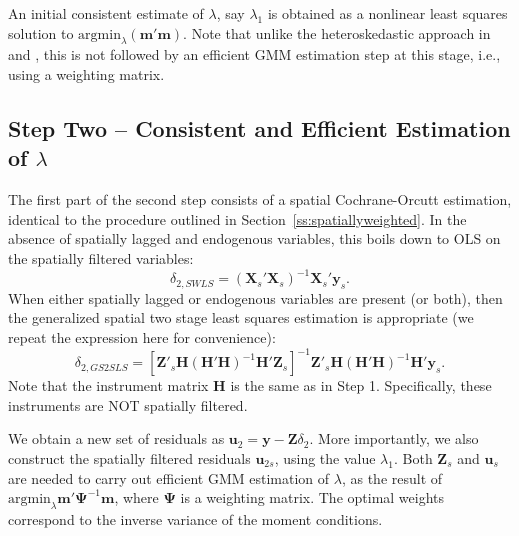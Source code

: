 \documentclass{article}
\begin{document}
 An initial consistent estimate of $\lambda$,
 say $\lambda_1$ is obtained as a nonlinear least
squares solution to $\mbox{argmin}_\lambda (\mathbf{m'm})$.
Note that unlike the heteroskedastic approach in \cite{KelejianPrucha:10} and \cite{Arraizetal:10},
this is not followed by an efficient GMM estimation step at this stage, i.e., using
a weighting matrix. 

\subsection{Step Two -- Consistent and Efficient Estimation of $\lambda$}\label{ss:steptwoestim}
 The first part of the second step consists of a spatial Cochrane-Orcutt estimation,
 identical to the procedure outlined in Section~\ref{ss:spatiallyweighted}. In the
 absence of spatially lagged and endogenous variables, this boils down to OLS on
 the spatially filtered variables:
 \begin{equation*}
 \delta_{2,SWLS} = (\mathbf{X}_{s}'\mathbf{X}_s)^{-1} \mathbf{X}_{s}' \mathbf{y}_s.
 \end{equation*}
 When either spatially lagged or endogenous variables are present (or both), then
 the generalized spatial two stage least squares estimation is appropriate
 (we repeat the expression here for convenience):
 \begin{equation*}
\delta_{2,GS2SLS} = [ \mathbf{Z'}_s \mathbf{H} (\mathbf{H'H})^{-1} \mathbf{H'} \mathbf{Z}_s ]^{-1} \mathbf{Z'}_s \mathbf{H} (\mathbf{H'H})^{-1} \mathbf{H'} \mathbf{y}_s.
\end{equation*}
Note that the instrument matrix $\mathbf{H}$ is the same as in Step 1. Specifically,
these instruments are NOT spatially filtered.

We obtain a new set of residuals as $\mathbf{u}_2 = \mathbf{y} - \mathbf{Z} \delta_2$.
More importantly, we also construct the spatially filtered residuals $\mathbf{u}_{2s}$, using
the value $\lambda_1$. Both $\mathbf{Z}_s$ and $\mathbf{u}_s$ are needed to carry out
efficient GMM estimation of $\lambda$, as the result of 
 $\mbox{argmin}_\lambda \mathbf{m'}\mathbf{\mathbf{\Psi}}^{-1} \mathbf{m}$, where $\mathbf{\Psi}$ is a weighting matrix.
The optimal weights correspond to the inverse variance of the moment conditions.
\end{document}
